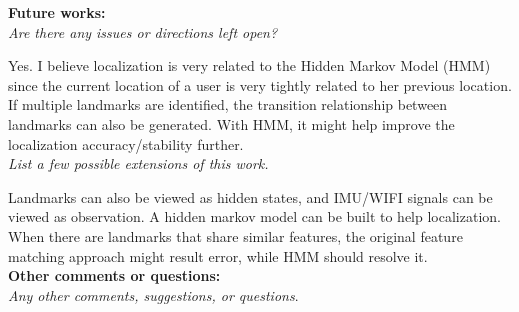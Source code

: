 \documentclass[11pt, oneside]{article}   	%
\begin{document}
\noindent \textbf{Future works:}\\
\emph{Are there any issues or directions left open?}

Yes. I believe localization is very related to the Hidden Markov Model (HMM) since the current location of a user is very tightly related to her previous location. If multiple landmarks are identified, the transition relationship between landmarks can also be generated. With HMM, it might help improve the localization accuracy/stability further.\\

\noindent \emph{List a few possible extensions of this work.}

Landmarks can also be viewed as hidden states, and IMU/WIFI signals can be viewed as observation. A hidden markov model can be built to help localization. When there are landmarks that share similar features, the original feature matching approach might result error, while HMM should resolve it. \\


\noindent \textbf{Other comments or questions:}\\
\emph{Any other comments, suggestions, or questions}.
\end{document}
